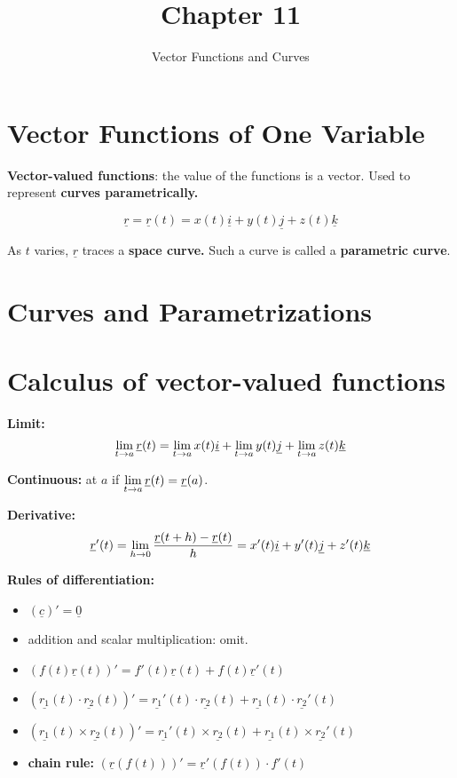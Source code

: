 \documentclass[11pt, a4paper]{MATH2023}
\title{Chapter 11}
\subtitle{Vector Functions and Curves}
\newcommand{\vct}{\underline}
\newcommand{\rr}{\underline{r}}
\newcommand{\ii}{\underline{i}}
\newcommand{\kk}{\underline{k}}
\newcommand{\jj}{\underline{j}}
\begin{document}
\begin{spacing}{1.3}

    \section{Vector Functions of One Variable}

    {\bf Vector-valued functions}: the value of the functions is a vector.
    Used to represent {\bf curves parametrically.}

    $$\rr=\rr(t)=x(t)\ii+y(t)\jj+z(t)\kk$$

    As $t$ varies, $\rr$ traces a {\bf space curve.} Such a curve is 
    called a {\bf parametric curve}.


    \section{Curves and Parametrizations}

    


    \section{Calculus of vector-valued functions}

    {\bf Limit:}
    $$\lim_{t\rar a}\rr(t)=\lim_{t\rar a}x(t)\ii+\lim_{t\rar a}y(t)\jj+\lim_{t\rar a}z(t)\kk$$

    {\bf Continuous:} at $a$ if $\disp \lim_{t\rar a}\rr(t)=\rr(a)$.

    {\bf Derivative: } 
    $$\rr'(t)=\lim_{h\rar 0}\frac{\rr(t+h)-\rr(t)}{h}=x'(t)\ii+y'(t)\jj+z'(t)\kk$$

    {\bf Rules of differentiation:}
    \begin{itemize}
        \item $(\vct{c})'=\vct{0}$
        \item addition and scalar multiplication: omit.
        \item $(f(t)\rr(t))'=f'(t)\rr(t)+f(t)\rr'(t)$
        \item $(\vct{r_1}(t)\cdot \vct{r_2}(t))'=\vct{r_1}'(t)\cdot \vct{r_2}(t)
        +\vct{r_1}(t)\cdot \vct{r_2}'(t)$
        \item $(\vct{r_1}(t)\times \vct{r_2}(t))'=\vct{r_1}'(t)\times \vct{r_2}(t)
        +\vct{r_1}(t)\times \vct{r_2}'(t)$
        \item {\bf chain rule:} $(\rr(f(t)))'=\rr'(f(t))\cdot f'(t)$
    \end{itemize}


\end{spacing}
\end{document}
